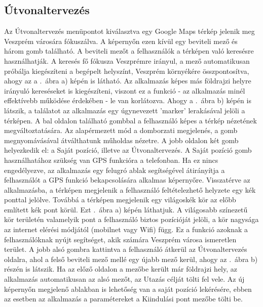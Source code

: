 \subsection {Útvonaltervezés}
\label {utvonalterv}
Az Útvonaltervezés menüpontot kiválasztva egy Google Maps térkép jelenik meg Veszprém városára fókuszálva.
A képernyőn ezen kívül egy beviteli mező és három gomb található.
A beviteli mezőt a felhasználók a térképen való keresésre használhatják.
A keresés fő fókusza Veszprémre irányul, a mező automatikusan próbálja kiegészíteni a begépelt helyszínt, Veszprém környékére összpontosítva, ahogy az a .\ ábra a) képén is látható.
Az alkalmazás képes más földrajzi helyre irányuló kereséseket is kiegészíteni, viszont ez a funkció - az alkalmazás minél effektívebb működése érdekében - le van korlátozva.
Ahogy a .\ ábra b) képén is látszik, a találatot az alkalmazás egy úgynevezett 'marker' lerakásával jelöli a térképen.
A bal oldalon található gombbal a felhasználó képes a térkép nézetének megváltoztatására.
Az alapérmezett mód a domborzati megjelenés, a gomb megnyomávásával átválthatunk műholdas nézetre.
A jobb oldalon két gomb helyezkedik el: a Saját pozíció, illetve az Útvonaltervezés.
A Saját pozíció gomb használhatához szükség van GPS funkcióra a telefonban.
Ha ez nincs engedélyezve, az alkalmazás egy felugró ablak segítségével átirányítja a felhasználót a GPS funkció bekapcsolására alkalmas képernyőre.
Visszatérve az alkalmazásba, a térképen megjelenik a felhasználó feltételezhető helyzete egy kék ponttal jelölve.
Továbbá a térképen megjelenik egy világoskék kör az előbb említett kék pont körül.
Ezt .\ ábra a) képén láthatjuk.
A világosabb színezetű kör területén valamelyik pont a felhasználó biztos pozícióját jelöli, a kör nagysága az internet elérési módjától (mobilnet vagy Wifi) függ.
Ez a funkció azoknak a felhasználóknak nyújt segítséget, akik számára Veszprém városa ismeretlen terület.
A jobb alsó gombra kattintva a felhasználó átkerül az Útvonaltervezés oldalra, ahol a felső beviteli mező mellé egy újabb mező kerül, ahogy az .\ ábra b) részén is látszik. 
Ha az előző oldalon a mezőbe került már földrajzi hely, az alkalmazás automatikusan az alsó mezőt, az Utazás célját tölti fel vele.
Az új képernyőn megjelenő ablakban is lehetőség van a saját pozíció lekérésére, ebben az esetben az alkalmazás a paramétereket a Kiindulási pont mezőbe tölti be.
